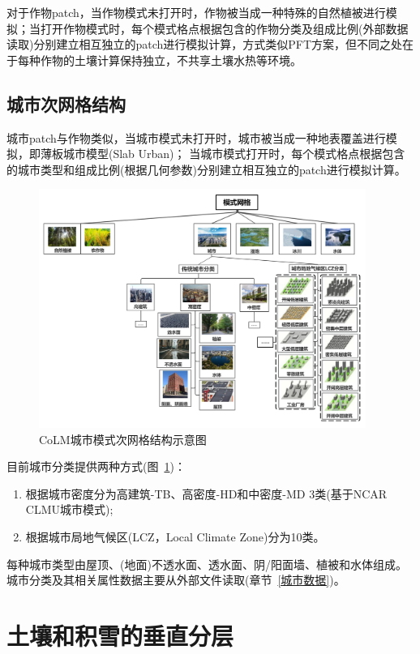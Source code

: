 对于作物patch，当作物模式未打开时，作物被当成一种特殊的自然植被进行模拟；当打开作物模式时，每个模式格点根据包含的作物分类及组成比例(外部数据读取)分别建立相互独立的patch进行模拟计算，方式类似PFT方案，但不同之处在于每种作物的土壤计算保持独立，不共享土壤水热等环境。

\subsection{城市次网格结构}
城市patch与作物类似，当城市模式未打开时，城市被当成一种地表覆盖进行模拟，即薄板城市模型(Slab Urban)；
当城市模式打开时，每个模式格点根据包含的城市类型和组成比例(根据几何参数)分别建立相互独立的patch进行模拟计算。

{
\begin{figure}[htbp]
\centering
\includegraphics[width=0.95\textwidth]{Figures/模式构架/CoLM城市次网格示意图.jpg}
\caption[CoLM城市模式次网格结构示意图]{CoLM城市模式次网格结构示意图}
\label{fig:城市次网格}
\end{figure}
}

目前城市分类提供两种方式(图~\ref{fig:城市次网格})：
\begin{enumerate}
    \item 根据城市密度分为高建筑-TB、高密度-HD和中密度-MD 3类(基于NCAR CLMU城市模式);
    \item 根据城市局地气候区(LCZ，Local Climate Zone)分为10类。
\end{enumerate}
每种城市类型由屋顶、(地面)不透水面、透水面、阴/阳面墙、植被和水体组成。
城市分类及其相关属性数据主要从外部文件读取(章节~\ref{城市数据})。

\section{土壤和积雪的垂直分层}\label{土壤和积雪的垂直分层}

